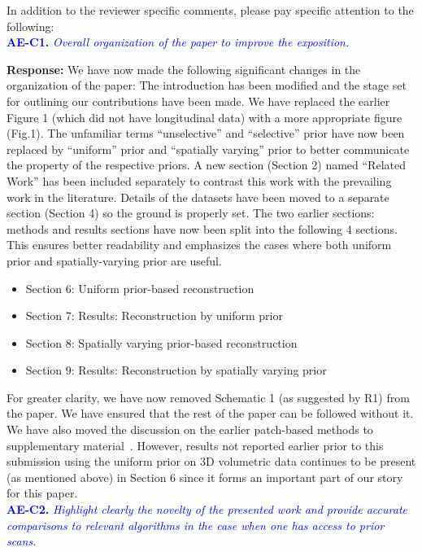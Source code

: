 \documentclass{article}
\begin{document}
In addition to the reviewer specific comments, please pay specific attention to the following:\\

\textcolor{blue}{\textbf{AE-C1.}\textit{ Overall organization of the paper to improve the exposition.}}

\textbf{Response:}
We have now made the following significant changes in the organization of the paper:
The introduction has been modified and the stage set for outlining our contributions have been made.  We have replaced the earlier Figure 1 (which did not have longitudinal data) with a more appropriate figure (Fig.1). The unfamiliar terms ``unselective'' and ``selective'' prior have now been replaced by ``uniform'' prior and ``spatially varying'' prior to better communicate the property of the respective priors.
A new section  (Section 2) named ``Related Work'' has been included separately to contrast this work with the prevailing work in the literature. 
Details of the datasets have been moved to a separate section (Section 4) so the ground is properly set.
The two earlier sections: methods and results sections have now been split into the following 4 sections. This ensures better readability and emphasizes the cases where both uniform prior and spatially-varying prior are useful.
\begin{itemize}
 \item Section 6: Uniform prior-based reconstruction
 \item Section 7: Results: Reconstruction by uniform prior
 \item Section 8: Spatially varying prior-based reconstruction
 \item Section 9: Results: Reconstruction by spatially varying prior
   \end{itemize}
For greater clarity, we have now removed Schematic 1 (as suggested by R1) from the paper. We have  ensured that the rest of the paper can be followed without it. We have also moved the discussion on the earlier patch-based methods to supplementary material~\cite{supp_paper}. However, results not reported earlier prior to this submission using the uniform prior on 3D volumetric data continues to be present (as mentioned above) in Section 6 since it forms an important part of our story for this paper.\\

\textcolor{blue}{\textbf{AE-C2.}\textit{ Highlight clearly the novelty of the presented work and provide accurate comparisons to relevant algorithms in the case when one has access to prior scans.}}
\end{document}
